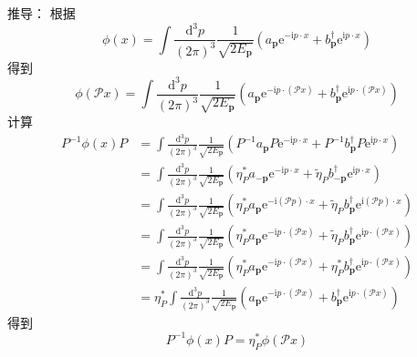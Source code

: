 推导：
根据
\begin{equation}
    \phi (x)=\int{\frac{\mathrm{d}^3p}{\left( 2\pi \right) ^3}}\frac{1}{\sqrt{2E_{\mathbf{p}}}}\left( a_{\mathbf{p}}\mathrm{e}^{-\mathrm{i}p\cdot x}+b_{\mathbf{p}}^{\dagger}\mathrm{e}^{\mathrm{i}p\cdot x} \right) 
\end{equation}
得到
\begin{equation}
    \phi (\mathcal{P} x)=\int{\frac{\mathrm{d}^3p}{\left( 2\pi \right) ^3}}\frac{1}{\sqrt{2E_{\mathbf{p}}}}\left( a_{\mathbf{p}}\mathrm{e}^{-\mathrm{i}p\cdot \left( \mathcal{P} x \right)}+b_{\mathbf{p}}^{\dagger}\mathrm{e}^{\mathrm{i}p\cdot \left( \mathcal{P} x \right)} \right) 
\end{equation}
计算
\begin{equation}
    \begin{aligned}
        P^{-1}\phi (x)P&=\int{\frac{\mathrm{d}^3p}{\left( 2\pi \right) ^3}}\frac{1}{\sqrt{2E_{\mathbf{p}}}}\left( P^{-1}a_{\mathbf{p}}P\mathrm{e}^{-\mathrm{i}p\cdot x}+P^{-1}b_{\mathbf{p}}^{\dagger}P\mathrm{e}^{\mathrm{i}p\cdot x} \right) 
\\
&=\int{\frac{\mathrm{d}^3p}{\left( 2\pi \right) ^3}}\frac{1}{\sqrt{2E_{\mathbf{p}}}}\left( \eta _{P}^{*}a_{-\mathbf{p}}\mathrm{e}^{-\mathrm{i}p\cdot x}+\tilde{\eta}_Pb_{-\mathbf{p}}^{\dagger}\mathrm{e}^{\mathrm{i}p\cdot x} \right) 
\\
&=\int{\frac{\mathrm{d}^3p}{\left( 2\pi \right) ^3}}\frac{1}{\sqrt{2E_{\mathbf{p}}}}\left( \eta _{P}^{*}a_{\mathbf{p}}\mathrm{e}^{-\mathrm{i}\left( \mathcal{P} p \right) \cdot x}+\tilde{\eta}_Pb_{\mathbf{p}}^{\dagger}\mathrm{e}^{\mathrm{i}\left( \mathcal{P} p \right) \cdot x} \right) 
\\
&=\int{\frac{\mathrm{d}^3p}{\left( 2\pi \right) ^3}}\frac{1}{\sqrt{2E_{\mathbf{p}}}}\left( \eta _{P}^{*}a_{\mathbf{p}}\mathrm{e}^{-\mathrm{i}p\cdot \left( \mathcal{P} x \right)}+\tilde{\eta}_Pb_{\mathbf{p}}^{\dagger}\mathrm{e}^{\mathrm{i}p\cdot \left( \mathcal{P} x \right)} \right) 
\\
&=\int{\frac{\mathrm{d}^3p}{\left( 2\pi \right) ^3}}\frac{1}{\sqrt{2E_{\mathbf{p}}}}\left( \eta _{P}^{*}a_{\mathbf{p}}\mathrm{e}^{-\mathrm{i}p\cdot \left( \mathcal{P} x \right)}+\eta _{P}^{*}b_{\mathbf{p}}^{\dagger}\mathrm{e}^{\mathrm{i}p\cdot \left( \mathcal{P} x \right)} \right) 
\\
&=\eta _{P}^{*}\int{\frac{\mathrm{d}^3p}{\left( 2\pi \right) ^3}}\frac{1}{\sqrt{2E_{\mathbf{p}}}}\left( a_{\mathbf{p}}\mathrm{e}^{-\mathrm{i}p\cdot \left( \mathcal{P} x \right)}+b_{\mathbf{p}}^{\dagger}\mathrm{e}^{\mathrm{i}p\cdot \left( \mathcal{P} x \right)} \right) 
    \end{aligned}
\end{equation}
得到
\begin{equation}
    P^{-1}\phi (x)P=\eta _{P}^{*}\phi (\mathcal{P} x)
\end{equation}


